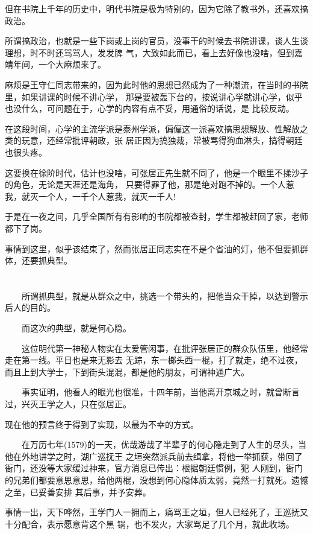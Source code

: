 \documentclass[11pt,a4paper,onecolumn]{article}
\begin{document}
但在书院上千年的历史中，明代书院是极为特别的，因为它除了教书外，还喜欢搞政治。

所谓搞政治，也就是一些下岗或上岗的官员，没事干的时候去书院讲课，谈人生谈理想，时不时还骂骂人，发发脾
气，大致如此而已，看上去好像也没啥，但到嘉靖年间，一个大麻烦来了。

麻烦是王守仁同志带来的，因为此时他的思想已然成为了一种潮流，在当时的书院里，如果讲课的时候不讲心学，
那是要被轰下台的，按说讲心学就讲心学，似乎也没什么，可问题在于，心学的内容有点不妥，用通俗的话说，是
比较反动。

在这段时间，心学的主流学派是泰州学派，偏偏这一派喜欢搞思想解放、性解放之类的玩意，还经常批评朝政，张
居正因为搞独裁，常被骂得狗血淋头，搞得朝廷也很头疼。

这要换在徐阶时代，估计也没啥，可张居正先生就不同了，他是一个眼里不揉沙子的角色，无论是天涯还是海角，
只要得罪了他，那是绝对跑不掉的。一个人惹我，就灭一个人，一千个人惹我，就灭一千人!

于是在一夜之间，几乎全国所有有影响的书院都被查封，学生都被赶回了家，老师都下了岗。

事情到这里，似乎该结束了，然而张居正同志实在不是个省油的灯，他不但要抓群体，还要抓典型。

\section[\thesection]{}

　　所谓抓典型，就是从群众之中，挑选一个带头的，把他当众干掉，以达到警示后人的目的。

　　而这次的典型，就是何心隐。

　　这位明代第一神秘人物实在太爱管闲事，在批评张居正的群众队伍里，他经常走在第一线。平日也是来无影去
无踪，东一榔头西一棍，打了就走，绝不过夜，而且上到大学士，下到街头混混，都是他的朋友，可谓神通广大。

　　事实证明，他看人的眼光也很准，十四年前，当他离开京城之时，就曾断言过，兴灭王学之人，只在张居正。

现在他的预言终于得到了实现，以最为不幸的方式。

　　在万历七年(1579)的一天，优哉游哉了半辈子的何心隐走到了人生的尽头，当他在外地讲学之时，湖广巡抚王
之垣突然派兵前去缉拿，将他一举抓获，带回了衙门，还没等大家缓过神来，官方消息已传出：根据朝廷惯例，犯
人刚到，衙门的兄弟们都要意思意思，给他两棍，没想到何心隐体质太弱，竟然一打就死。遗憾之至，已妥善安排
其后事，并予安葬。

事情一出，天下哗然，王学门人一拥而上，痛骂王之垣，但人已经死了，王巡抚又十分配合，表示愿意背这个黑
锅，也不发火，大家骂足了几个月，就此收场。
\end{document}
